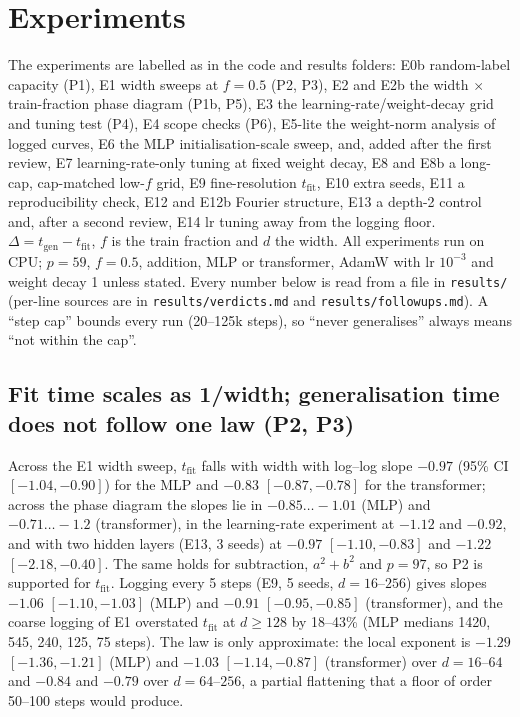 \documentclass{article}
\begin{document}
\section{Experiments}
The experiments are labelled as in the code and results folders: E0b random-label capacity (P1), E1 width sweeps at $f=0.5$ (P2, P3), E2 and E2b the width $\times$ train-fraction phase diagram (P1b, P5), E3 the learning-rate/weight-decay grid and tuning test (P4), E4 scope checks (P6), E5-lite the weight-norm analysis of logged curves, E6 the MLP initialisation-scale sweep, and, added after the first review, E7 learning-rate-only tuning at fixed weight decay, E8 and E8b a long-cap, cap-matched low-$f$ grid, E9 fine-resolution $t_{\mathrm{fit}}$, E10 extra seeds, E11 a reproducibility check, E12 and E12b Fourier structure, E13 a depth-2 control and, after a second review, E14 lr tuning away from the logging floor. $\Delta=t_{\mathrm{gen}}-t_{\mathrm{fit}}$, $f$ is the train fraction and $d$ the width. All experiments run on CPU; $p=59$, $f=0.5$, addition, MLP or transformer, AdamW with lr $10^{-3}$ and weight decay 1 unless stated. Every number below is read from a file in \texttt{results/} (per-line sources are in \texttt{results/verdicts.md} and \texttt{results/followups.md}). A ``step cap'' bounds every run (20--125k steps), so ``never generalises'' always means ``not within the cap''.

\subsection{Fit time scales as 1/width; generalisation time does not follow one law (P2, P3)}
Across the E1 width sweep, $t_{\mathrm{fit}}$ falls with width with log--log slope $-0.97$ (95\% CI $[-1.04,-0.90]$) for the MLP and $-0.83$ $[-0.87,-0.78]$ for the transformer; across the phase diagram the slopes lie in $-0.85\ldots-1.01$ (MLP) and $-0.71\ldots-1.2$ (transformer), in the learning-rate experiment at $-1.12$ and $-0.92$, and with two hidden layers (E13, 3 seeds) at $-0.97$ $[-1.10,-0.83]$ and $-1.22$ $[-2.18,-0.40]$. The same holds for subtraction, $a^2+b^2$ and $p=97$, so P2 is supported for $t_{\mathrm{fit}}$. Logging every 5 steps (E9, 5 seeds, $d=16$--$256$) gives slopes $-1.06$ $[-1.10,-1.03]$ (MLP) and $-0.91$ $[-0.95,-0.85]$ (transformer), and the coarse logging of E1 overstated $t_{\mathrm{fit}}$ at $d\ge128$ by 18--43\% (MLP medians 1420, 545, 240, 125, 75 steps). The law is only approximate: the local exponent is $-1.29$ $[-1.36,-1.21]$ (MLP) and $-1.03$ $[-1.14,-0.87]$ (transformer) over $d=16$--$64$ and $-0.84$ and $-0.79$ over $d=64$--$256$, a partial flattening that a floor of order 50--100 steps would produce.
\end{document}
